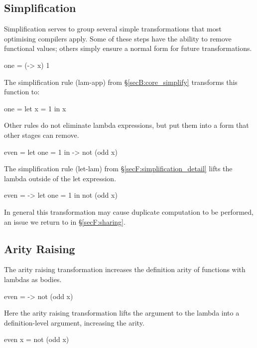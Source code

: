 \subsection{Simplification}

Simplification serves to group several simple transformations that most optimising compilers apply. Some of these steps have the ability to remove functional values; others simply ensure a normal form for future transformations.

\begin{example}
\begin{code}
one = (\x -> x) 1
\end{code}

\noindent The simplification rule (lam-app) from \S\ref{secB:core_simplify} transforms this function to:

\begin{code}
one = let x = 1 in x
\end{code}
\end{example}

\noindent Other rules do not eliminate lambda expressions, but put them into a form that other stages can remove.

\begin{example}
\begin{code}
even =  let  one = 1
        in   \x -> not (odd x)
\end{code}

\noindent The simplification rule (let-lam) from \S\ref{secF:simplification_detail} lifts the lambda outside of the let expression.

\begin{code}
even = \x ->  let  one = 1
              in   not (odd x)
\end{code}

\noindent In general this transformation may cause duplicate computation to be performed, an issue we return to in \S\ref{secF:sharing}.
\end{example}


\subsection{Arity Raising}

The arity raising transformation increases the definition arity of functions with lambdas as bodies.

\begin{example}
\begin{code}
even = \x -> not (odd x)
\end{code}

\noindent Here the arity raising transformation lifts the argument to the lambda into a definition-level argument, increasing the arity.

\begin{code}
even x = not (odd x)
\end{code}
\end{example}


